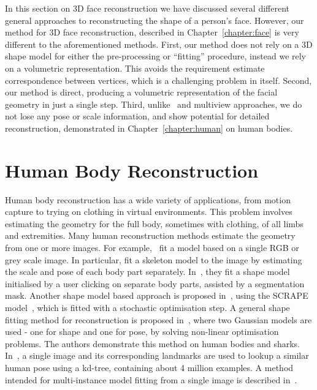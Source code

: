 In this section on 3D face reconstruction we have discussed several
different general approaches to reconstructing the shape of a person's
face. However, our method for 3D face reconstruction, described in
Chapter~\ref{chapter:face} is very different to the aforementioned
methods. First, our method does not rely on a 3D shape model for
either the pre-processing or ``fitting'' procedure, instead we rely on
a volumetric representation. This avoids the requirement estimate
correspondence between vertices, which is a challenging problem in
itself. Second, our method is direct, producing a volumetric
representation of the facial geometry in just a single step. Third,
unlike~\cite{tran2018extreme} and multiview approaches, we do not lose
any pose or scale information, and show potential for detailed
reconstruction, demonstrated in Chapter~\ref{chapter:human} on human
bodies.




\section{Human Body Reconstruction}

Human body reconstruction has a wide variety of applications, from
motion capture to trying on clothing in virtual environments. This
problem involves estimating the geometry for the full body, sometimes
with clothing, of all limbs and extremities. Many human reconstruction
methods estimate the geometry from one or more images. For
example,~\cite{balan2007detailed,grest2005human,guan2009estimating}
fit a model based on a single RGB or grey scale image. In particular,
\cite{grest2005human} fit a skeleton model to the image by estimating
the scale and pose of each body part
separately. In~\cite{guan2009estimating}, they fit a shape model
initialised by a user clicking on separate body parts, assisted by a
segmentation mask. Another shape model based approach is proposed
in~\cite{balan2007detailed}, using the SCRAPE
model~\cite{anguelov2005scape}, which is fitted with a stochastic
optimisation step. A general shape fitting method for reconstruction
is proposed in~\cite{chen2010inferring}, where two Gaussian models are
used - one for shape and one for pose, by solving non-linear
optimisation problems. The authors demonstrate this method on human
bodies and sharks. In~\cite{jiang20103d}, a single image and its
corresponding landmarks are used to lookup a similar human pose using
a kd-tree, containing about 4 million examples. A method intended for
multi-instance model fitting from a single image is described
in~\cite{Zanfir_2018_CVPR}.

